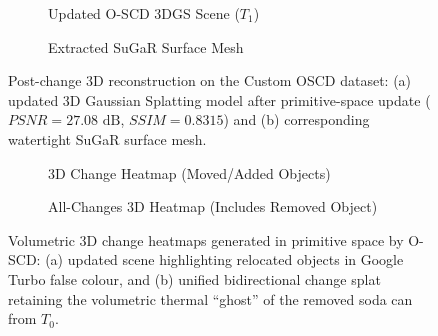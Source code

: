 \begin{figure}[htbp]
    \centering
    \begin{subfigure}[b]{0.48\textwidth}
        \centering
        \caption{Updated O-SCD 3DGS Scene ($T_1$)}
        \label{fig:oscd_updated_splat}
    \end{subfigure}
    \hfill
    \begin{subfigure}[b]{0.48\textwidth}
        \centering
        \caption{Extracted SuGaR Surface Mesh}
        \label{fig:oscd_sugar_mesh}
    \end{subfigure}
    \caption{Post-change 3D reconstruction on the Custom OSCD dataset: (a) updated 3D Gaussian Splatting model after primitive-space update ($PSNR = 27.08\text{ dB}$, $SSIM = 0.8315$) and (b) corresponding watertight SuGaR surface mesh.}
    \label{fig:oscd_reconstruction_mesh}
\end{figure}

\begin{figure}[htbp]
    \centering
    \begin{subfigure}[b]{0.48\textwidth}
        \centering
        \caption{3D Change Heatmap (Moved/Added Objects)}
        \label{fig:oscd_heatmap_turbo}
    \end{subfigure}
    \hfill
    \begin{subfigure}[b]{0.48\textwidth}
        \centering
        \caption{All-Changes 3D Heatmap (Includes Removed Object)}
        \label{fig:oscd_heatmap_all_changes}
    \end{subfigure}
    \caption{Volumetric 3D change heatmaps generated in primitive space by O-SCD: (a) updated scene highlighting relocated objects in Google Turbo false colour, and (b) unified bidirectional change splat retaining the volumetric thermal ``ghost'' of the removed soda can from $T_0$.}
    \label{fig:oscd_3d_heatmap}
\end{figure}

